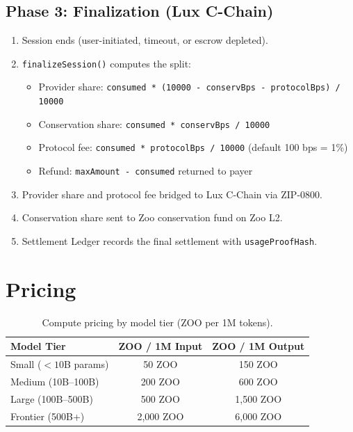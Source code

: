 \documentclass[11pt,letterpaper]{article}
\begin{document}
\subsection{Phase 3: Finalization (Lux C-Chain)}

\begin{enumerate}
    \item Session ends (user-initiated, timeout, or escrow depleted).
    \item \texttt{finalizeSession()} computes the split:
    \begin{itemize}
        \item Provider share: \texttt{consumed * (10000 - conservBps - protocolBps) / 10000}
        \item Conservation share: \texttt{consumed * conservBps / 10000}
        \item Protocol fee: \texttt{consumed * protocolBps / 10000} (default 100 bps = 1\%)
        \item Refund: \texttt{maxAmount - consumed} returned to payer
    \end{itemize}
    \item Provider share and protocol fee bridged to Lux C-Chain via ZIP-0800.
    \item Conservation share sent to Zoo conservation fund on Zoo L2.
    \item Settlement Ledger records the final settlement with \texttt{usageProofHash}.
\end{enumerate}

\section{Pricing}

\begin{table}[t]
\centering
\begin{tabular}{lcc}
\toprule
\textbf{Model Tier} & \textbf{ZOO / 1M Input} & \textbf{ZOO / 1M Output} \\
\midrule
Small ($< 10$B params) & 50 ZOO & 150 ZOO \\
Medium (10B--100B) & 200 ZOO & 600 ZOO \\
Large (100B--500B) & 500 ZOO & 1,500 ZOO \\
Frontier (500B+) & 2,000 ZOO & 6,000 ZOO \\
\bottomrule
\end{tabular}
\caption{Compute pricing by model tier (ZOO per 1M tokens).}
\label{tab:pricing}
\end{table}
\end{document}
